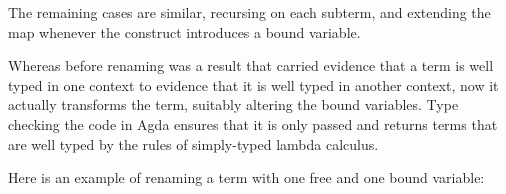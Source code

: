 The remaining cases are similar, recursing on each subterm, and
extending the map whenever the construct introduces a bound variable.

Whereas before renaming was a result that carried evidence that a term
is well typed in one context to evidence that it is well typed in
another context, now it actually transforms the term, suitably altering
the bound variables. Type checking the code in Agda ensures that it is
only passed and returns terms that are well typed by the rules of
simply-typed lambda calculus.

Here is an example of renaming a term with one free and one bound
variable:

\begin{fence}
\begin{code}%
\>[0]\AgdaSpace{}%
\AgdaSymbol{:}\AgdaSpace{}%
\AgdaSpace{}%
\AgdaOperator{\AgdaInductiveConstructor{,}}\AgdaSpace{}%
\AgdaSpace{}%
\AgdaSpace{}%
\AgdaSpace{}%
\AgdaSpace{}%
\AgdaSpace{}%
\AgdaSpace{}%
\<%
\\
\>[0]\AgdaSpace{}%
\AgdaSymbol{=}\AgdaSpace{}%
\AgdaSpace{}%
\AgdaSymbol{(}\AgdaOperator{\AgdaFunction{\#}}\AgdaSpace{}%
\AgdaSpace{}%
\AgdaSpace{}%
\AgdaSymbol{(}\AgdaOperator{\AgdaFunction{\#}}\AgdaSpace{}%
\AgdaSpace{}%
\AgdaSpace{}%
\AgdaOperator{\AgdaFunction{\#}}\AgdaSpace{}%
\AgdaSymbol{))}\<%
\\
%
\\[\AgdaEmptyExtraSkip]%
\>[0]\AgdaSpace{}%
\AgdaSymbol{:}\AgdaSpace{}%
\AgdaSpace{}%
\AgdaOperator{\AgdaInductiveConstructor{,}}\AgdaSpace{}%
\AgdaSpace{}%
\AgdaSpace{}%
\AgdaSpace{}%
\AgdaOperator{\AgdaInductiveConstructor{,}}\AgdaSpace{}%
\AgdaSpace{}%
\AgdaSpace{}%
\AgdaSpace{}%
\AgdaSpace{}%
\<%
\\
\>[0]\AgdaSpace{}%

\end{code}
\end{fence}
